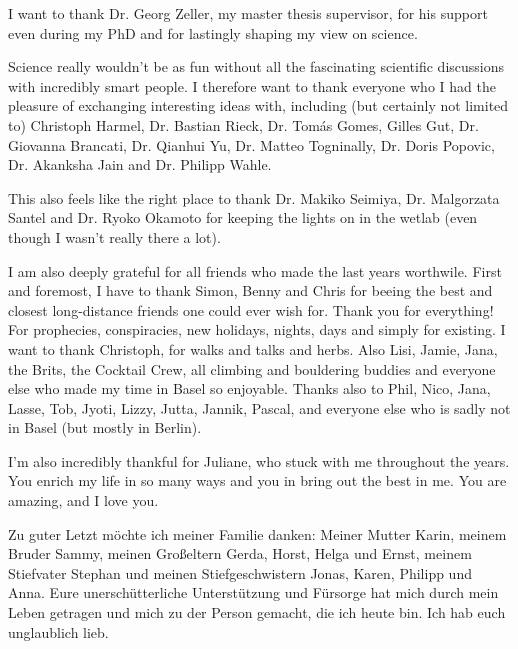 I want to thank Dr. Georg Zeller, my master thesis supervisor, for his support even during my PhD and for lastingly shaping my view on science. 

Science really wouldn't be as fun without all the fascinating scientific discussions with incredibly smart people. I therefore want to thank everyone who I had the pleasure of exchanging interesting ideas with, including (but certainly not limited to) Christoph Harmel, Dr. Bastian Rieck, Dr. Tomás Gomes, Gilles Gut, Dr. Giovanna Brancati, Dr. Qianhui Yu, Dr. Matteo Togninally, Dr. Doris Popovic, Dr. Akanksha Jain and Dr. Philipp Wahle. 

This also feels like the right place to thank Dr. Makiko Seimiya, Dr. Malgorzata Santel and Dr. Ryoko Okamoto for keeping the lights on in the wetlab (even though I wasn't really there a lot). 

I am also deeply grateful for all friends who made the last years worthwile. First and foremost, I have to thank Simon, Benny and Chris for beeing the best and closest long-distance friends one could ever wish for. Thank you for everything! For prophecies, conspiracies, new holidays, nights, days and simply for existing. I want to thank  Christoph, for walks and talks and herbs. Also Lisi, Jamie, Jana, the Brits, the Cocktail Crew, all climbing and bouldering buddies and everyone else who made my time in Basel so enjoyable. Thanks also to Phil, Nico, Jana, Lasse, Tob, Jyoti, Lizzy, Jutta, Jannik, Pascal, and everyone else who is sadly not in Basel (but mostly in Berlin). 

I'm also incredibly thankful for Juliane, who stuck with me throughout the years. You enrich my life in so many ways and you in bring out the best in me. You are amazing, and I love you. 

Zu guter Letzt möchte ich meiner Familie danken: Meiner Mutter Karin, meinem Bruder Sammy, meinen Großeltern Gerda, Horst, Helga und Ernst, meinem Stiefvater Stephan und meinen Stiefgeschwistern Jonas, Karen, Philipp und Anna. Eure unerschütterliche Unterstützung und Fürsorge hat mich durch mein Leben getragen und mich zu der Person gemacht, die ich heute bin. Ich hab euch unglaublich lieb. 



